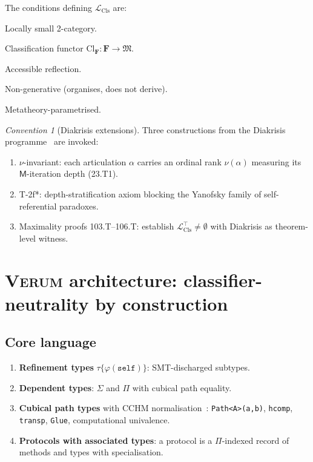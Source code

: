 \documentclass[11pt, a4paper]{article}
\theoremstyle{definition}
\theoremstyle{remark}
\newtheorem{convention}[theorem]{Convention}
\newcommand{\fM}{\mathfrak{M}}
\newcommand{\LCls}{\mathcal{L}_{\mathrm{Cls}}}
\newcommand{\LClsMax}{\mathcal{L}_{\mathrm{Cls}}^{\top}}
\newcommand{\Verum}{\textsc{Verum}}
\begin{document}
The conditions defining $\LCls$ are:
\begin{description}[nosep]
\item[(M1)] Locally small 2-category.
\item[(M2)] Classification functor $\mathrm{Cl}_{\mathbf{F}} : \mathbf{F} \to \fM$.
\item[(M3)] Accessible reflection.
\item[(M4)] Non-generative (organises, does not derive).
\item[(M5)] Metatheory-parametrised.
\end{description}

\begin{convention}[Diakrisis extensions]
\label{conv:diakrisis-extensions}
Three constructions from the Diakrisis programme~\cite{Diakrisis} are invoked:
\begin{enumerate}[label=(D\arabic*), nosep]
\item $\nu$-invariant: each articulation $\alpha$ carries an ordinal rank $\nu(\alpha)$ measuring its $\mathsf{M}$-iteration depth (23.T1).
\item T-2f*: depth-stratification axiom blocking the Yanofsky family of self-referential paradoxes.
\item Maximality proofs 103.T--106.T: establish $\LClsMax \neq \emptyset$ with Diakrisis as theorem-level witness.
\end{enumerate}
\end{convention}

\section{\Verum{} architecture: classifier-neutrality by construction}
\label{sec:verum-architecture}

\subsection{Core language}
\label{subsec:core-language}

\begin{enumerate}[nosep]
\item \textbf{Refinement types} $\tau\{\varphi(\mathtt{self})\}$: SMT-discharged subtypes.
\item \textbf{Dependent types}: $\Sigma$ and $\Pi$ with cubical path equality.
\item \textbf{Cubical path types} with CCHM normalisation~\cite{CCHM2015}: \texttt{Path<A>(a,b)}, \texttt{hcomp}, \texttt{transp}, \texttt{Glue}, computational univalence.
\item \textbf{Protocols with associated types}: a protocol is a $\Pi$-indexed record of methods and types with specialisation.
\end{enumerate}
\end{document}
